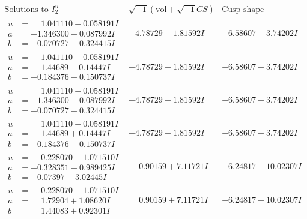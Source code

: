 \documentclass[1p]{elsarticle_modified}
\theoremstyle{definition}
\newcommand{\I}{\sqrt{-1}}
\begin{document}
$$\begin{array}{c|c|c}  
\text{Solutions to }I^u_{2}& \I (\text{vol} + \sqrt{-1}CS) & \text{Cusp shape}\\
 \hline 
\begin{aligned}
u &= \phantom{-}1.041110 + 0.058191 I \\
a &= -1.346300 - 0.087992 I \\
b &= -0.070727 + 0.324415 I\end{aligned}
 & -4.78729 - 1.81592 I & -6.58607 + 3.74202 I \\ \hline\begin{aligned}
u &= \phantom{-}1.041110 + 0.058191 I \\
a &= \phantom{-}1.44689 - 0.14447 I \\
b &= -0.184376 + 0.150737 I\end{aligned}
 & -4.78729 - 1.81592 I & -6.58607 + 3.74202 I \\ \hline\begin{aligned}
u &= \phantom{-}1.041110 - 0.058191 I \\
a &= -1.346300 + 0.087992 I \\
b &= -0.070727 - 0.324415 I\end{aligned}
 & -4.78729 + 1.81592 I & -6.58607 - 3.74202 I \\ \hline\begin{aligned}
u &= \phantom{-}1.041110 - 0.058191 I \\
a &= \phantom{-}1.44689 + 0.14447 I \\
b &= -0.184376 - 0.150737 I\end{aligned}
 & -4.78729 + 1.81592 I & -6.58607 - 3.74202 I \\ \hline\begin{aligned}
u &= \phantom{-}0.228070 + 1.071510 I \\
a &= -0.328351 - 0.989425 I \\
b &= -0.07397 - 3.02445 I\end{aligned}
 & \phantom{-}0.90159 + 7.11721 I & -6.24817 - 10.02307 I \\ \hline\begin{aligned}
u &= \phantom{-}0.228070 + 1.071510 I \\
a &= \phantom{-}1.72904 + 1.08620 I \\
b &= \phantom{-}1.44083 + 0.92301 I\end{aligned}
 & \phantom{-}0.90159 + 7.11721 I & -6.24817 - 10.02307 I \\ \hline\begin{aligned}

\end{aligned}
\end{array}$$
\end{document}
